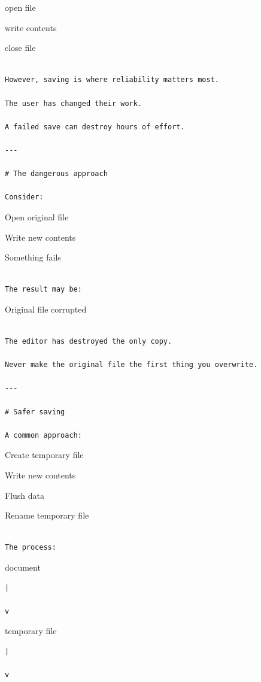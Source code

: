 \documentclass[
  oneside,
  openany]{book}
\begin{document}
open file

write contents

close file

\begin{verbatim}

However, saving is where reliability matters most.

The user has changed their work.

A failed save can destroy hours of effort.

---

# The dangerous approach

Consider:
\end{verbatim}

Open original file

Write new contents

Something fails

\begin{verbatim}

The result may be:
\end{verbatim}

Original file corrupted

\begin{verbatim}

The editor has destroyed the only copy.

Never make the original file the first thing you overwrite.

---

# Safer saving

A common approach:
\end{verbatim}

Create temporary file

Write new contents

Flush data

Rename temporary file

\begin{verbatim}

The process:
\end{verbatim}

document

\begin{verbatim}
|

v
\end{verbatim}

temporary file

\begin{verbatim}
|

v
\end{verbatim}
\end{document}
